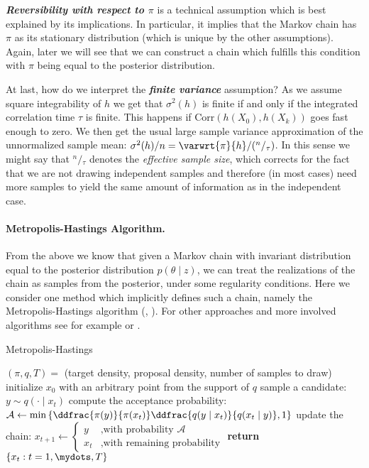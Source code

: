 \textbf{\emph{Reversibility with respect to $\pi$}} is a technical assumption which is best explained by its implications.
In particular, it implies that the Markov chain has $\pi$ as its stationary distribution (which is unique by the other assumptions).
Again, later we will see that we can construct a chain which fulfills this condition with $\pi$ being equal to the posterior distribution.

At last, how do we interpret the \textbf{\emph{finite variance}} assumption?
As we assume square integrability of $h$ we get that $\sigma^2(h)$ is finite if and only if the integrated correlation time $\tau$ is finite.
This happens if $\text{Corr}(h(X_0), h(X_k))$ goes fast enough to zero.
We then get the usual large sample variance approximation of the unnormalized sample mean: $\sigma^2(h) / n = \varwrt{\pi}{h} / ({}^n/{}_\tau)$.
In this sense we might say that ${}^n/{}_\tau$ denotes the \emph{effective sample size}, which corrects for the fact that we are not drawing independent samples and therefore (in most cases) need more samples to yield the same amount of information as in the independent case.

\paragraph{Metropolis-Hastings Algorithm.}
From the above we know that given a Markov chain with invariant distribution equal to the posterior distribution $p(\theta \mid z)$, we can treat the realizations of the chain as samples from the posterior, under some regularity conditions.
Here we consider one method which implicitly defines such a chain, namely the Metropolis-Hastings algorithm (\citet{Metropolis1953}, \citet{hastings70}).
For other approaches and more involved algorithms see for example \citet{roberts2004} or \citet{liang10}.

\begin{algorithm}
\caption{Metropolis-Hastings}\label{alg:metropolis-hastings}
\begin{algorithmic}[1]
  \Require $(\pi, q, T) =$ (target density, proposal density, number of samples to draw)
\State initialize $x_0$ with an arbitrary point from the support of $q$
  \State sample a candidate: $y \sim q(\cdot \mid x_t)$
  \State compute the acceptance probability: $\mathcal{A} \gets \min\left\{ \ddfrac{\pi(y)}{\pi(x_t)} \ddfrac{q(y \mid x_t)}{q(x_t \mid y)}, 1\right\}$
  \State update the chain: $x_{t+1} \gets \begin{cases} y &\mbox{,with probability } \mathcal{A}\\ x_t &\mbox{,with remaining probability} \end{cases}$
\EndFor{}
\State \textbf{return} $\{x_t : t = 1,\mydots,T\}$
\end{algorithmic}
\end{algorithm}

